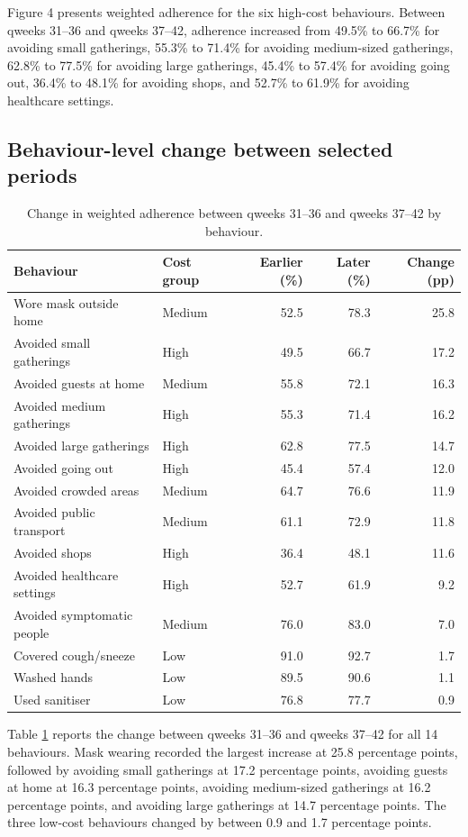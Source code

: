 \documentclass[
  12pt,
  a4paper,
]{article}
\begin{document}
Figure 4 presents weighted adherence for the six high-cost behaviours.
Between qweeks 31--36 and qweeks 37--42, adherence increased from 49.5\% to
66.7\% for avoiding small gatherings, 55.3\% to 71.4\% for avoiding
medium-sized gatherings, 62.8\% to 77.5\% for avoiding large gatherings,
45.4\% to 57.4\% for avoiding going out, 36.4\% to 48.1\% for avoiding
shops, and 52.7\% to 61.9\% for avoiding healthcare settings.

\subsection{Behaviour-level change between selected periods}\label{behaviour-level-change-between-selected-periods}

\begin{longtable}[t]{llrrr}
\caption{\label{tab:behaviour-period-change-table}Change in weighted adherence between qweeks 31--36 and qweeks 37--42 by behaviour.}\\
\toprule
Behaviour & Cost group & Earlier (\%) & Later (\%) & Change (pp)\\
\midrule
Wore mask outside home & Medium & 52.5 & 78.3 & 25.8\\
Avoided small gatherings & High & 49.5 & 66.7 & 17.2\\
Avoided guests at home & Medium & 55.8 & 72.1 & 16.3\\
Avoided medium gatherings & High & 55.3 & 71.4 & 16.2\\
Avoided large gatherings & High & 62.8 & 77.5 & 14.7\\
\addlinespace
Avoided going out & High & 45.4 & 57.4 & 12.0\\
Avoided crowded areas & Medium & 64.7 & 76.6 & 11.9\\
Avoided public transport & Medium & 61.1 & 72.9 & 11.8\\
Avoided shops & High & 36.4 & 48.1 & 11.6\\
Avoided healthcare settings & High & 52.7 & 61.9 & 9.2\\
\addlinespace
Avoided symptomatic people & Medium & 76.0 & 83.0 & 7.0\\
Covered cough/sneeze & Low & 91.0 & 92.7 & 1.7\\
Washed hands & Low & 89.5 & 90.6 & 1.1\\
Used sanitiser & Low & 76.8 & 77.7 & 0.9\\
\bottomrule
\end{longtable}

Table \ref{tab:behaviour-period-change-table} reports the change
between qweeks 31--36 and qweeks 37--42 for all 14 behaviours. Mask
wearing recorded the largest increase at 25.8 percentage points,
followed by avoiding small gatherings at 17.2 percentage points,
avoiding guests at home at 16.3 percentage points, avoiding medium-sized
gatherings at 16.2 percentage points, and avoiding large gatherings at
14.7 percentage points. The three low-cost behaviours changed by between
0.9 and 1.7 percentage points.
\end{document}
